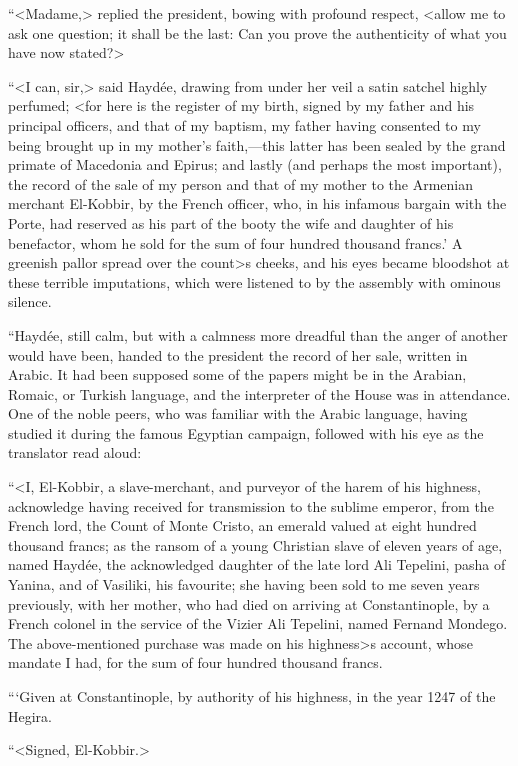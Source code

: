  “<Madame,> replied the president, bowing with profound respect, <allow me to ask one question; it shall be the last: Can you prove the authenticity of what you have now stated?> 

 “<I can, sir,> said Haydée, drawing from under her veil a satin satchel highly perfumed; <for here is the register of my birth, signed by my father and his principal officers, and that of my baptism, my father having consented to my being brought up in my mother's faith,—this latter has been sealed by the grand primate of Macedonia and Epirus; and lastly (and perhaps the most important), the record of the sale of my person and that of my mother to the Armenian merchant El-Kobbir, by the French officer, who, in his infamous bargain with the Porte, had reserved as his part of the booty the wife and daughter of his benefactor, whom he sold for the sum of four hundred thousand francs.' A greenish pallor spread over the count>s cheeks, and his eyes became bloodshot at these terrible imputations, which were listened to by the assembly with ominous silence. 

 “Haydée, still calm, but with a calmness more dreadful than the anger of another would have been, handed to the president the record of her sale, written in Arabic. It had been supposed some of the papers might be in the Arabian, Romaic, or Turkish language, and the interpreter of the House was in attendance. One of the noble peers, who was familiar with the Arabic language, having studied it during the famous Egyptian campaign, followed with his eye as the translator read aloud: 

 “<I, El-Kobbir, a slave-merchant, and purveyor of the harem of his highness, acknowledge having received for transmission to the sublime emperor, from the French lord, the Count of Monte Cristo, an emerald valued at eight hundred thousand francs; as the ransom of a young Christian slave of eleven years of age, named Haydée, the acknowledged daughter of the late lord Ali Tepelini, pasha of Yanina, and of Vasiliki, his favourite; she having been sold to me seven years previously, with her mother, who had died on arriving at Constantinople, by a French colonel in the service of the Vizier Ali Tepelini, named Fernand Mondego. The above-mentioned purchase was made on his highness>s account, whose mandate I had, for the sum of four hundred thousand francs. 

 “‘Given at Constantinople, by authority of his highness, in the year 1247 of the Hegira. 

 “<Signed, El-Kobbir.> 

